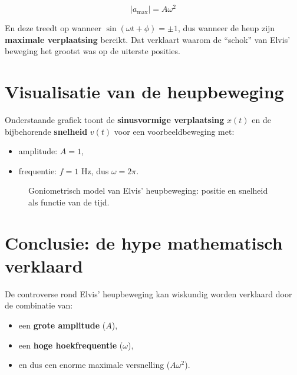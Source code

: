 \documentclass{book}
\begin{document}
	\[
	|a_{\text{max}}| = A \omega^2
	\]
	
	En deze treedt op wanneer $\sin(\omega t + \phi) = \pm 1$, 
	dus wanneer de heup zijn \textbf{maximale verplaatsing} bereikt.  
	Dat verklaart waarom de ``schok'' van Elvis' beweging het grootst was op de uiterste posities.
	
	\section{Visualisatie van de heupbeweging}
	
	Onderstaande grafiek toont de \textbf{sinusvormige verplaatsing} $x(t)$ en de bijbehorende 
	\textbf{snelheid} $v(t)$ voor een voorbeeldbeweging met:
	
	\begin{itemize}
		\item amplitude: $A = 1$,
		\item frequentie: $f = 1$ Hz, dus \(\omega = 2\pi\).
	\end{itemize}
	
	\begin{figure}[h!]
		\centering
		\caption{Goniometrisch model van Elvis' heupbeweging: positie en snelheid als functie van de tijd.}
		\label{fig:elvis_sinus}
	\end{figure}
	
	\section{Conclusie: de hype mathematisch verklaard}
	
	De controverse rond Elvis' heupbeweging kan wiskundig worden verklaard door de combinatie van:
	
	\begin{itemize}
		\item een \textbf{grote amplitude} ($A$),
		\item een \textbf{hoge hoekfrequentie} ($\omega$),
		\item en dus een enorme maximale versnelling ($A\omega^2$).
	\end{itemize}
	
\end{document}
